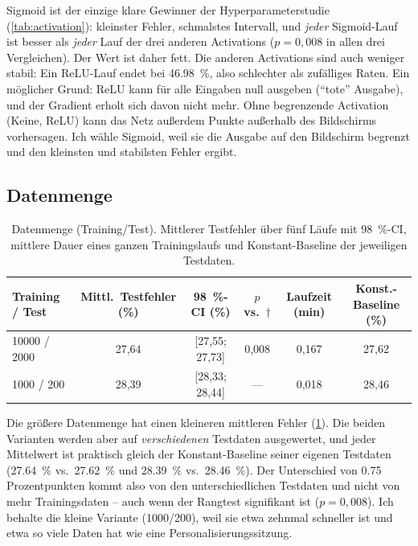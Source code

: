 Sigmoid ist der einzige klare Gewinner der Hyperparameterstudie
(\cref{tab:activation}): kleinster Fehler, schmalstes Intervall, und
\emph{jeder} Sigmoid-Lauf ist besser als \emph{jeder} Lauf der drei anderen
Activations ($p=0,008$ in allen drei Vergleichen). Der Wert ist daher fett.
Die anderen Activations sind auch weniger stabil: Ein ReLU-Lauf endet bei
\SI{46,98}{\percent}, also schlechter als zufälliges Raten. Ein möglicher
Grund: ReLU kann für alle Eingaben null ausgeben (\enquote{tote} Ausgabe), und
der Gradient erholt sich davon nicht mehr. Ohne begrenzende Activation (Keine,
ReLU) kann das Netz außerdem Punkte außerhalb des Bildschirms vorhersagen. Ich
wähle Sigmoid, weil sie die Ausgabe auf den Bildschirm begrenzt und den
kleinsten und stabilsten Fehler ergibt.

\subsection{Datenmenge}
\label{sec:size}

\begin{table}[htbp]
  \centering
  \caption[Datenmenge (Training/Test)]{Datenmenge (Training/Test). Mittlerer Testfehler über fünf
           Läufe mit \SI{98}{\percent}-CI, mittlere Dauer eines ganzen
           Trainingslaufs und Konstant-Baseline der jeweiligen Testdaten.}
  \label{tab:dataset_size}
  \small
  \setlength{\tabcolsep}{3.5pt}
  \begin{tabular}{lccccc}
    \toprule
    Training / Test & Mittl.\ Testfehler (\%) & \SI{98}{\percent}-CI (\%) & $p$ vs.\ $\dagger$ & Laufzeit (min) & Konst.-Baseline (\%) \\
    \midrule
    \num{10000} / \num{2000}      & 27,64 & [27,55; 27,73] & 0,008 & 0,167 & 27,62 \\
    \num{1000} / \num{200}\sel{}  & 28,39 & [28,33; 28,44] & ---   & 0,018 & 28,46 \\
    \bottomrule
  \end{tabular}
\end{table}

Die größere Datenmenge hat einen kleineren mittleren Fehler
(\cref{tab:dataset_size}). Die beiden Varianten werden aber auf
\emph{verschiedenen} Testdaten ausgewertet, und jeder Mittelwert ist praktisch
gleich der Konstant-Baseline seiner eigenen Testdaten (\SI{27,64}{\percent}
vs.\ \SI{27,62}{\percent} und \SI{28,39}{\percent} vs.\ \SI{28,46}{\percent}).
Der Unterschied von \num{0,75} Prozentpunkten kommt also von den
unterschiedlichen Testdaten und nicht von mehr Trainingsdaten -- auch wenn der
Rangtest signifikant ist ($p=0,008$). Ich behalte die kleine Variante
(\num{1000}/\num{200}), weil sie etwa zehnmal schneller ist und etwa so viele
Daten hat wie eine Personalisierungssitzung.

